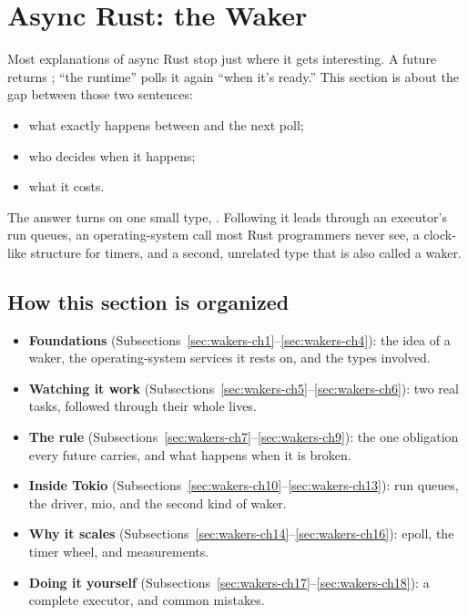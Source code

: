 \section{Async Rust: the Waker}
\label{sec:wakers}

Most explanations of async Rust stop just where it gets interesting. A future returns ; ``the runtime'' polls it again ``when it's ready.'' This section is about the gap between those two sentences:

\begin{itemize}
    \item what exactly happens between  and the next poll;
    \item who decides when it happens;
    \item what it costs.
\end{itemize}

The answer turns on one small type, . Following it leads through an executor's run queues, an operating-system call most Rust programmers never see, a clock-like structure for timers, and a second, unrelated type that is also called a waker.

\subsection*{How this section is organized}

\begin{itemize}
    \item \textbf{Foundations} (Subsections~\ref{sec:wakers-ch1}--\ref{sec:wakers-ch4}): the idea of a waker, the operating-system services it rests on, and the types involved.
    \item \textbf{Watching it work} (Subsections~\ref{sec:wakers-ch5}--\ref{sec:wakers-ch6}): two real tasks, followed through their whole lives.
    \item \textbf{The rule} (Subsections~\ref{sec:wakers-ch7}--\ref{sec:wakers-ch9}): the one obligation every future carries, and what happens when it is broken.
    \item \textbf{Inside Tokio} (Subsections~\ref{sec:wakers-ch10}--\ref{sec:wakers-ch13}): run queues, the driver, mio, and the second kind of waker.
    \item \textbf{Why it scales} (Subsections~\ref{sec:wakers-ch14}--\ref{sec:wakers-ch16}): epoll, the timer wheel, and measurements.
    \item \textbf{Doing it yourself} (Subsections~\ref{sec:wakers-ch17}--\ref{sec:wakers-ch18}): a complete executor, and common mistakes.
\end{itemize}

